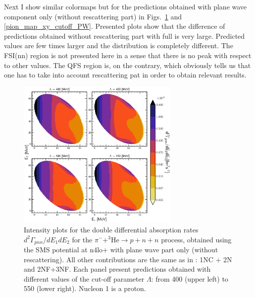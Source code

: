     Next I show similar colormaps but for the predictions obtained with plane wave component only (without rescattering part)
    in Figs.~\ref{pion_map_E1E2_cutoff_PW} and \ref{pion_map_xy_cutoff_PW}. Presented plots show that
    the difference of predictions obtained without rescattering part with full is very large. 
    Predicted values 
    are few times larger and the distribution is completely different.
    The FSI(nn) region is not presented here in a sense that there is no peak with respect to other 
    values. The QFS region is, on the contrary, 
    which obviously tells us that one has to take into account rescattering pat in order to obtain relevant results.   

    \begin{figure}[h]
        \begin{center}
        \includegraphics[width=0.7\textwidth]{PlotData/PION/Dalitz_maps/figures/Dalitz_map_pnn_E1E2_cutofs_PWIAS.pdf}
        \end{center}
        \caption{Intensity plots for the double differential absorption rates
        $d^2 \Gamma_{pnn}/dE_1dE_2$ for the $\pi^- + ^3\text{He} \rightarrow p + n + n$
        process, obtained using the SMS potential at \gls{n4lo+}
        with plane wave part only (without rescattering).
        All other contributions are the same as in : 1NC + 2N and 2NF+3NF.
        Each panel present predictions obtained with different values of the cut-off parameter $\Lambda$:
        from \SI{400}{\mev} (upper left) to \SI{550}{\mev} (lower right). Nucleon 1 is a proton.}
        \label{pion_map_E1E2_cutoff_PW}
    \end{figure}

